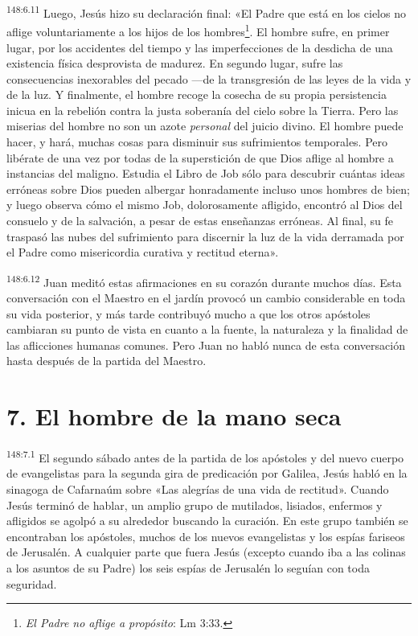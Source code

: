 \par
\textsuperscript{148:6.11} Luego, Jesús hizo su declaración final: «El Padre que está en los cielos no aflige voluntariamente a los hijos de los hombres\footnote{\textit{El Padre no aflige a propósito}: Lm 3:33.}. El hombre sufre, en primer lugar, por los accidentes del tiempo y las imperfecciones de la desdicha de una existencia física desprovista de madurez. En segundo lugar, sufre las consecuencias inexorables del pecado ---de la transgresión de las leyes de la vida y de la luz. Y finalmente, el hombre recoge la cosecha de su propia persistencia inicua en la rebelión contra la justa soberanía del cielo sobre la Tierra. Pero las miserias del hombre no son un azote \textit{personal} del juicio divino. El hombre puede hacer, y hará, muchas cosas para disminuir sus sufrimientos temporales. Pero libérate de una vez por todas de la superstición de que Dios aflige al hombre a instancias del maligno. Estudia el Libro de Job sólo para descubrir cuántas ideas erróneas sobre Dios pueden albergar honradamente incluso unos hombres de bien; y luego observa cómo el mismo Job, dolorosamente afligido, encontró al Dios del consuelo y de la salvación, a pesar de estas enseñanzas erróneas. Al final, su fe traspasó las nubes del sufrimiento para discernir la luz de la vida derramada por el Padre como misericordia curativa y rectitud eterna».

\par
\textsuperscript{148:6.12} Juan meditó estas afirmaciones en su corazón durante muchos días. Esta conversación con el Maestro en el jardín provocó un cambio considerable en toda su vida posterior, y más tarde contribuyó mucho a que los otros apóstoles cambiaran su punto de vista en cuanto a la fuente, la naturaleza y la finalidad de las aflicciones humanas comunes. Pero Juan no habló nunca de esta conversación hasta después de la partida del Maestro.

\section*{7. El hombre de la mano seca}
\par
\textsuperscript{148:7.1} El segundo sábado antes de la partida de los apóstoles y del nuevo cuerpo de evangelistas para la segunda gira de predicación por Galilea, Jesús habló en la sinagoga de Cafarnaúm sobre «Las alegrías de una vida de rectitud». Cuando Jesús terminó de hablar, un amplio grupo de mutilados, lisiados, enfermos y afligidos se agolpó a su alrededor buscando la curación. En este grupo también se encontraban los apóstoles, muchos de los nuevos evangelistas y los espías fariseos de Jerusalén. A cualquier parte que fuera Jesús (excepto cuando iba a las colinas a los asuntos de su Padre) los seis espías de Jerusalén lo seguían con toda seguridad.

